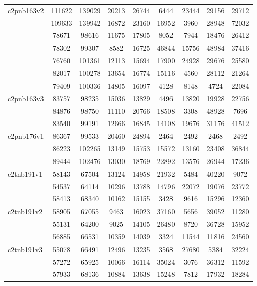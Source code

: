 \documentclass[a4paper]{article}
\begin{document}
\begin{center}
\begin{longtable}{ |l|c|c|c|c|c|c|c|c| }
c2pnb163v2 & 111622 & 139029 & 20213 & 26744 & 6444 & 23444 & 29156 & 29712 \\ 
& 109633 & 139942 & 16872 & 23160 & 16952 & 3960 & 28948 & 72032 \\
& 78671 & 98616 & 11675 & 17805 & 8052 & 7944 & 18476 & 26412 \\ 
& 78302 & 99307 & 8582 & 16725 & 46844 & 15756 & 48984 & 37416 \\
& 76760 & 101361 & 12113 & 15694 & 17900 & 24928 & 29676 & 25580 \\
& 82017 & 100278 & 13654 & 16774 & 15116 & 4560 & 28112 & 21264 \\ 
& 79409 & 100336 & 14805 & 16097 & 4128 & 8148 & 4724 & 22084 \\ \hline

c2pnb163v3 & 83757 & 98235 & 15036 & 13829 & 4496 & 13820 & 19928 & 22756 \\ 
& 84876 & 98750 & 11110 & 20766 & 18508 & 3308 & 48928 & 7696 \\ 
& 83540 & 99191 & 12666 & 16845 & 14108 & 19676 & 31176 & 41512 \\ \hline

c2pnb176v1 & 86367 & 99533 & 20460 & 24894 & 2464 & 2492 & 2468 & 2492 \\ 
& 86223 & 102265 & 13149 & 15753 & 15572 & 13160 & 23408 & 36844 \\
& 89444 & 102476 & 13030 & 18769 & 22892 & 13576 & 26944 & 17236 \\ \hline

c2tnb191v1 & 58143 & 67504 & 13124 & 14958 & 21932 & 5484 & 40220 & 9072 \\
& 54537 & 64114 & 10296 & 13788 & 14796 & 22072 & 19076 & 23772 \\ 
& 58413 & 68340 & 10162 & 15155 & 3428 & 9616 & 15296 & 12360 \\ \hline

c2tnb191v2 & 58905 & 67055 & 9463 & 16023 & 37160 & 5656 & 39052 & 11280 \\ 
& 55131 & 64200 & 9025 & 14105 & 26480 & 8720 & 36728 & 15952 \\ 
& 56885 & 66531 & 10359 & 14039 & 3324 & 11544 & 11816 & 24560 \\ \hline

c2tnb191v3 & 55078 & 66491 & 12496 & 13235 & 3568 & 27680 & 5384 & 32224 \\
& 57272 & 65925 & 10066 & 16114 & 35024 & 3076 & 36312 & 11592 \\ 
& 57933 & 68136 & 10884 & 13638 & 15248 & 7812 & 17932 & 18284 \\ \hline


\end{longtable}
\end{center}
\end{document}
